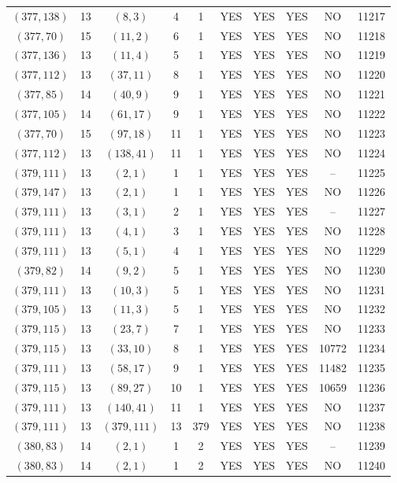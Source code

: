 \begin{longtable}{|c|c|c|c|c|c|c|c|c|c|}
$(377, 138)$ & 13 & $(8, 3)$ & 4 & 1 & YES & YES & YES & NO & 11217\\
$(377, 70)$ & 15 & $(11, 2)$ & 6 & 1 & YES & YES & YES & NO & 11218\\
$(377, 136)$ & 13 & $(11, 4)$ & 5 & 1 & YES & YES & YES & NO & 11219\\
$(377, 112)$ & 13 & $(37, 11)$ & 8 & 1 & YES & YES & YES & NO & 11220\\
$(377, 85)$ & 14 & $(40, 9)$ & 9 & 1 & YES & YES & YES & NO & 11221\\
$(377, 105)$ & 14 & $(61, 17)$ & 9 & 1 & YES & YES & YES & NO & 11222\\
$(377, 70)$ & 15 & $(97, 18)$ & 11 & 1 & YES & YES & YES & NO & 11223\\
$(377, 112)$ & 13 & $(138, 41)$ & 11 & 1 & YES & YES & YES & NO & 11224\\
$(379, 111)$ & 13 & $(2, 1)$ & 1 & 1 & YES & YES & YES & -- & 11225\\
$(379, 147)$ & 13 & $(2, 1)$ & 1 & 1 & YES & YES & YES & NO & 11226\\
$(379, 111)$ & 13 & $(3, 1)$ & 2 & 1 & YES & YES & YES & -- & 11227\\
$(379, 111)$ & 13 & $(4, 1)$ & 3 & 1 & YES & YES & YES & NO & 11228\\
$(379, 111)$ & 13 & $(5, 1)$ & 4 & 1 & YES & YES & YES & NO & 11229\\
$(379, 82)$ & 14 & $(9, 2)$ & 5 & 1 & YES & YES & YES & NO & 11230\\
$(379, 111)$ & 13 & $(10, 3)$ & 5 & 1 & YES & YES & YES & NO & 11231\\
$(379, 105)$ & 13 & $(11, 3)$ & 5 & 1 & YES & YES & YES & NO & 11232\\
$(379, 115)$ & 13 & $(23, 7)$ & 7 & 1 & YES & YES & YES & NO & 11233\\
$(379, 115)$ & 13 & $(33, 10)$ & 8 & 1 & YES & YES & YES & 10772 & 11234\\
$(379, 111)$ & 13 & $(58, 17)$ & 9 & 1 & YES & YES & YES & 11482 & 11235\\
$(379, 115)$ & 13 & $(89, 27)$ & 10 & 1 & YES & YES & YES & 10659 & 11236\\
$(379, 111)$ & 13 & $(140, 41)$ & 11 & 1 & YES & YES & YES & NO & 11237\\
$(379, 111)$ & 13 & $(379, 111)$ & 13 & 379 & YES & YES & YES & NO & 11238\\
$(380, 83)$ & 14 & $(2, 1)$ & 1 & 2 & YES & YES & YES & -- & 11239\\
$(380, 83)$ & 14 & $(2, 1)$ & 1 & 2 & YES & YES & YES & NO & 11240\\

\end{longtable}
